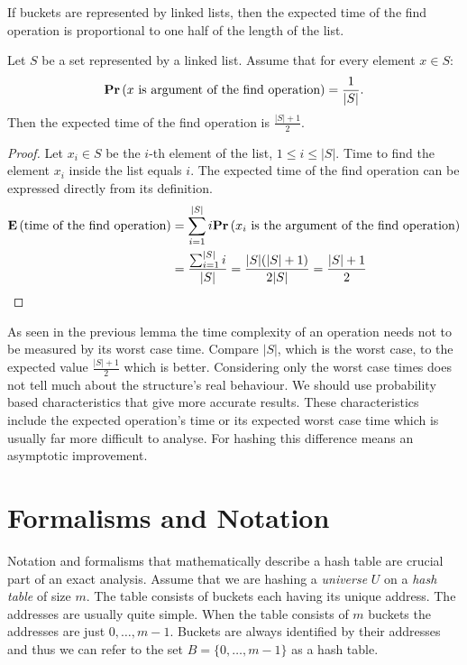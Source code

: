 If buckets are represented by linked lists, then the expected time of the find operation is proportional to one half of the length of the list.
\begin{lemma}
\label{lemma-expected-list-time}
Let $S$ be a set represented by a linked list. Assume that for every element $x \in S$: \[ \mathbf{Pr}\left(x \text{ is argument of the find operation}\right) = \frac{1}{|S|} \text{.} \] Then the expected time of the find operation is $\frac{|S| + 1}{2}$.
\end{lemma}
\begin{proof}
Let $x_i \in S$ be the $i$-th element of the list, $1 \leq i \leq |S|$. Time to find the element $x_i$ inside the list equals $i$. The expected time of the find operation can be expressed directly from its definition. 
\[
\begin{split}
\mathbf{E}\left(\text{time of the find operation}\right) 
	& = \displaystyle\sum_{i = 1}^{|S|} i \mathbf{Pr}\left(x_i \text{ is the argument of the find operation}\right) \\
	& = \frac{\sum_{i = 1}^{|S|}{i}}{|S|} = \frac{|S|(|S| + 1)}{2 |S|} = \frac{|S| + 1}{2} \\
\end{split}
\]
\end{proof}

As seen in the previous lemma the time complexity of an operation needs not to be measured by its worst case time. Compare $|S|$, which is the worst case, to the expected value $\frac{|S| + 1}{2}$ which is better. Considering only the worst case times does not tell much about the structure's real behaviour. We should use probability based characteristics that give more accurate results. These characteristics include the expected operation's time or its expected worst case time which is usually far more difficult to analyse. For hashing this difference means an asymptotic improvement.

\section{Formalisms and Notation}
\label{section-notation}
Notation and formalisms that mathematically describe a hash table are crucial part of an exact analysis. Assume that we are hashing a \emph{universe} $U$ on a \emph{hash table} of size $m$. The table consists of buckets each having its unique address. The addresses are usually quite simple. When the table consists of $m$ buckets the addresses are just $0, \dots, m - 1$. Buckets are always identified by their addresses and thus we can refer to the set $B = \{0, \dots, m - 1\}$ as a hash table.

